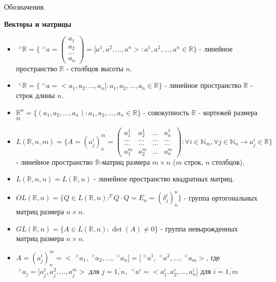 \documentclass[__main__.tex]{subfiles}
\begin{document}
Обозначения.

\textbf{Векторы и матрицы}

\begin{itemize}
	\item 
	$\;^{>}\mathbb{R} = \lbrace \;^{>}a = 
	\left(
	\begin{matrix}
	a_1 \\
	a_2 \\
	... \\
	a_n
	\end{matrix} 
	\right)
	= [a^1,a^2, ... ,a^n> : a^1, a^2, ... , a^n \in \mathbb{R}
	\rbrace$ - линейное пространство $\mathbb{R}$ - столбцов высоты $n$.
	
	\item 
	$\;^{<}\mathbb{R} = \lbrace \;^{<}a = < a_1,a_2, ... , a_n ] : a_1, a_2, ... , a_n \in \mathbb{R}
	\rbrace$ - линейное пространство $\mathbb{R}$ - строк длины $n$.
	
	\item
	$\mathbb{R}^n = \lbrace (a_1, a_2, ... , a_n): a_1, a_2, ... , a_n \in \mathbb{R} \rbrace$ - совокупность $\mathbb{R}$ - кортежей размера $n$
	
	\item
	$L(\mathbb{R}, n, m) = \lbrace A = (a^i_j)^m_n = \left( 
	\begin{matrix}
	a^1_1 & a^1_2 & ... & a^1_n \\
	... & ... & ... & ... \\
	... & ... & ... & ... \\
	a^m_1 & a^m_2 & ... & a^m_n
	\end{matrix}
	\right): \forall i \in \mathbb{N}_m, \forall j \in \mathbb{N}_n \rightarrow a_j^i \in \mathbb{R} \rbrace$ - линейное пространство $\mathbb{R}$-матриц размера $m \times n$ ($m$ строк, $n$ столбцов).
	
	\item
	$L (\mathbb{R},n,n) = L (\mathbb{R},n)$ - линейное пространство квадратных матриц.
	
	\item
	$OL(\mathbb{R},n) = \lbrace Q \in L(\mathbb{R},n): ^{T}Q \cdot Q = E_n = (\delta ^i_j)^n_n \rbrace$ - группа ортогональных матриц размера $n \times n$.
	
	\item
	$GL(\mathbb{R},n) = \lbrace A \in L(\mathbb{R},n): \det (A) \neq 0 \rbrace$ - группа невырожденных матриц размера $n \times n$.
	
	\item
	$A = (a^i_j)^m_n = < \;^{>}a_1, \;^{>}a_2, ... , \;^{>}a_n] = [\;^{<}a^1, \;^{<}a^2, ... , \;^{<}a_m >$, где $\;^{>}a_j = [a^1_j, a^2_j, ... , a^m_j >$ для $j = \overline{1,n}$, $\;^{<}a^i = < a^i_1, a^i_2, ... , a^i_n]$ для $i = \overline{1,m}$
\end{itemize}
\end{document}
